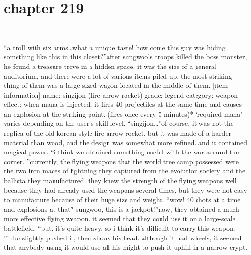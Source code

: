 \section{chapter 219}

                             




“a troll with six arms…what a unique taste! how come this guy was hiding something like this in this closet?”after sungwoo’s troops killed the boss monster, he found a treasure trove in a hidden space.
it was the size of a general auditorium, and there were a lot of various items piled up.
the most striking thing of them was a large-sized wagon located in the middle of them.
[item information]-name: singijon (fire arrow rocket)-grade: legend-category: weapon-effect: when mana is injected, it fires 40 projectiles at the same time and causes an explosion at the striking point.
 (fires once every 5 minutes)* ‘required mana’ varies depending on the user’s skill level.
“singijon…”of course, it was not the replica of the old korean-style fire arrow rocket.
 but it was made of a harder material than wood, and the design was somewhat more refined.
 and it contained magical power.
“i think we obtained something useful with the war around the corner.
”currently, the flying weapons that the world tree camp possessed were the two iron maces of lightning they captured from the evolution society and the ballista they manufactured.
they knew the strength of the flying weapons well because they had already used the weapons several times, but they were not easy to manufacture because of their huge size and weight.
“wow! 40 shots at a time and explosions at that? sungwoo, this is a jackpot!”now, they obtained a much more effective flying weapon.
 it seemed that they could use it on a large-scale battlefield.
“but, it’s quite heavy, so i think it’s difficult to carry this weapon.
”inho slightly pushed it, then shook his head.
 although it had wheels, it seemed that anybody using it would use all his might to push it uphill in a narrow crypt.

